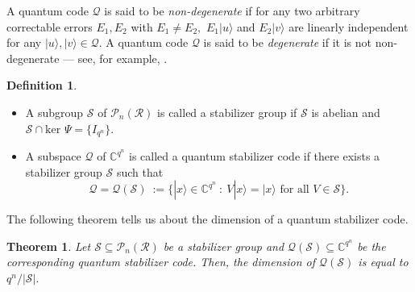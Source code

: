 \documentclass{article}
\newtheorem{thm}{Theorem}[section]
\theoremstyle{remark}
\theoremstyle{definition}
\newtheorem{defin}{Definition}[section]
\numberwithin{equation}{section}
\begin{document}
A quantum code $\mathcal{Q}$ is said to be \emph{non-degenerate} if for any two arbitrary correctable errors $E_1, E_2$ with $E_1 \neq E_2,$ $ E_1 | u \rangle$ and $E_2 | v \rangle$ are linearly independent for any $| u \rangle, | v \rangle \in \mathcal{Q}.$ A quantum code $\mathcal{Q}$ is said to be \emph{degenerate} if it is not non-degenerate --- see, for example, \cite{calder}.

\begin{defin}\cite{luerssen} \begin{itemize}\item[(a)] A subgroup $\mathcal{S}$ of $\mathcal{P}_n(\mathcal{R})$ is called a stabilizer group if 
$\mathcal{S}$ is abelian and $\mathcal{S}  \cap \text{ker } \Psi= \{I_{q{^{n}}}\}.$
\item[(b)] A subspace $\mathcal{Q}$ of $\mathbb{C}^{q^n}$ is called a quantum stabilizer code if there exists a stabilizer group $\mathcal{S}$ such that
$$\mathcal{Q}=\mathcal{Q}(\mathcal{S})~:= \{| x\rangle \in \mathbb{C}^{q^n} ~:~ V | x\rangle =| x\rangle \text{~for all~} V \in \mathcal{S}\}.$$
\end{itemize}
\end{defin}


The following theorem tells us about the dimension of a quantum stabilizer code.
\begin{thm}\label{dim} \cite{luerssen} Let $\mathcal{S} \subseteq \mathcal{P}_n(\mathcal{R}) $ be a stabilizer group and $\mathcal{Q}(\mathcal{S}) \subseteq \mathbb{C}^{q^n}$ be the corresponding quantum stabilizer code. Then, the dimension of $\mathcal{Q}(\mathcal{S})$ is equal to $ q^n/|\mathcal{S}|.$
\end{thm}

\end{document}
